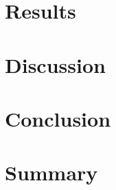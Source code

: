 \documentclass[14pt,a4paper,onecolumn]{article}
\begin{document}
\section{Results}

\section{Discussion}

\section{Conclusion}

\section{Summary}

\newpage


\end{document}
